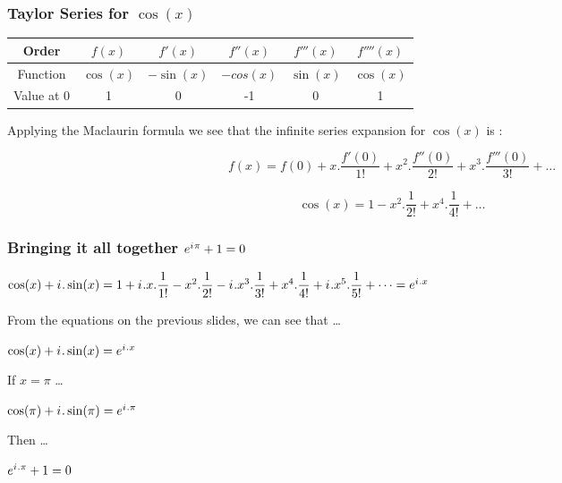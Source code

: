 \documentclass[10pt]{beamer}
\newcommand{\iu}{{i\mkern1mu}}
\begin{document}
\begin{frame}
	\frametitle{Taylor Series for $\cos(x)$}
	\begin{center}
		\begin{tabular}{|c|c|c|c|c|c|}
			\hline
			Order & $f(x)$    & $f'(x)$    & $f''(x)$  & $f'''(x)$ & $f''''(x)$ \\
			\hline
			Function & $\cos(x)$ & $-\sin(x)$ & $-cos(x)$ & $\sin(x)$ & $\cos(x)$  \\
			\hline
			Value at 0 & 1         & 0          & -1        & 0         & 1          \\
			\hline
		\end{tabular}
	\end{center}
	\vspace{20pt}
	Applying the Maclaurin formula we see that the infinite series expansion for $\cos(x)$ is :

	\large $$f(x) = f(0)+x.\dfrac{f'(0)}{1!}+ x^2.\dfrac{f''(0)}{2!} +x^3.\dfrac{f'''(0)}{3!} + \dots$$

	\large $$\cos(x) = 1- x^2.\dfrac{1}{2!} +x^4.\dfrac{1}{4!} + \dots$$

\end{frame}

\begin{frame}
	\frametitle{Bringing it all together \hspace{25pt} \textcolor{pink}{\Huge\(e^{\iu \pi} +1 = 0\)}}
	\begin{center}
	$\cos(x) + \iu.\sin(x) = 1+\iu.x.\dfrac{1}{1!}- x^2.\dfrac{1}{2!} -\iu.x^3.\dfrac{1}{3!} +x^4.\dfrac{1}{4!} + \iu.x^5.\dfrac{1}{5!} +\dots = e^{\iu.x}$
	\end{center}

	From the equations on the previous slides, we can see that \dots
	\begin{center}
		$\cos(x) + \iu.\sin(x) = e^{\iu.x}$ 
	\end{center} 
	If $x = \pi$ \dots
	\begin{center}
		$\cos(\pi) + \iu.\sin(\pi) = e^{\iu.\pi}$ \\
	\end{center}
	Then \dots
	\begin{center}
		$e^{\iu.\pi} + 1 = 0$
	\end{center}
\end{frame}
\end{document}
